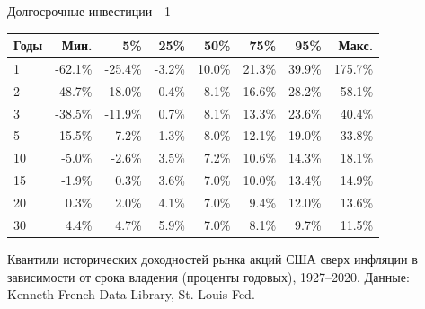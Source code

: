 \documentclass{beamer}
\begin{document}
\begin{frame}{Долгосрочные инвестиции - 1}
\centering
\small
\begin{tabular}{l|r|r|r|r|r|r|r}
Годы & Мин.    &     5\% &   25\% &   50\% &   75\% &   95\% & Макс. \\ \hline
1    & -62.1\% & -25.4\% & -3.2\% & 10.0\% & 21.3\% & 39.9\% & 175.7\% \\
2    & -48.7\% & -18.0\% &  0.4\% &  8.1\% & 16.6\% & 28.2\% &  58.1\% \\
3    & -38.5\% & -11.9\% &  0.7\% &  8.1\% & 13.3\% & 23.6\% &  40.4\% \\ 
5    & -15.5\% &  -7.2\% &  1.3\% &  8.0\% & 12.1\% & 19.0\% &  33.8\% \\
10   &  -5.0\% &  -2.6\% &  3.5\% &  7.2\% & 10.6\% & 14.3\% &  18.1\% \\
15   &  -1.9\% &   0.3\% &  3.6\% &  7.0\% & 10.0\% & 13.4\% &  14.9\% \\
20   &   0.3\% &   2.0\% &  4.1\% &  7.0\% &  9.4\% & 12.0\% &  13.6\% \\
30   &   4.4\% &   4.7\% &  5.9\% &  7.0\% &  8.1\% &  9.7\% &  11.5\% 
\end{tabular}

\justify
Квантили исторических доходностей рынка акций США сверх инфляции в зависимости от срока владения (проценты годовых), 1927--2020. Данные: Kenneth French Data Library, St. Louis  Fed.
\end{frame}



\newcommand{\addQuantilePlot}[3] {
    \addplot[
        color=#2,
        style=#3,
        thick
    ] 
    table [
        x=holding_period,
        y=#1,
        col sep=comma
    ]
    {data/us_mkt_holding_periods.csv};
}
\end{document}
